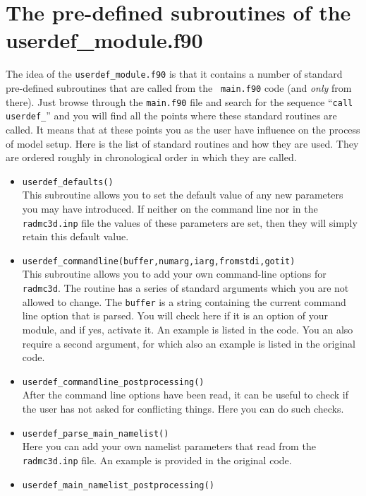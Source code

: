 \documentclass{report}
\begin{document}
\section{The pre-defined subroutines of the userdef\_module.f90}
\label{sec-predef-userdef}
The idea of the {\small\tt userdef\_module.f90} is that it contains a number
of standard pre-defined subroutines that are called from the {\small\tt
  main.f90} code (and {\em only} from there). Just browse through the
{\small\tt main.f90} file and search for the sequence ``{\small\tt call
  userdef\_}'' and you will find all the points where these standard
routines are called. It means that at these points you as the user have
influence on the process of model setup. Here is the list of standard
routines and how they are used. They are ordered roughly in chronological
order in which they are called.
\begin{itemize}
\item {\small\tt userdef\_defaults()}\\
  This subroutine allows you to set the default value of any new parameters
  you may have introduced. If neither on the command line nor in the
  {\small\tt radmc3d.inp} file the values of these parameters are set, then
  they will simply retain this default value.
\item {\small\tt userdef\_commandline(buffer,numarg,iarg,fromstdi,gotit)}\\
  This subroutine allows you to add your own command-line options for
  {\small\tt radmc3d}. The routine has a series of standard arguments which
  you are not allowed to change. The {\small\tt buffer} is a string
  containing the current command line option that is parsed. You will check
  here if it is an option of your module, and if yes, activate it.  An
  example is listed in the code. You an also require a second argument, for
  which also an example is listed in the original code.
\item {\small\tt userdef\_commandline\_postprocessing()}\\
  After the command line options have been read, it can be useful to
  check if the user has not asked for conflicting things. Here you can
  do such checks.
\item {\small\tt userdef\_parse\_main\_namelist()}\\
  Here you can add your own namelist parameters that read from the
  {\small\tt radmc3d.inp} file. An example is provided in the original
  code.
\item {\small\tt userdef\_main\_namelist\_postprocessing()}\\

\end{itemize}
\end{document}
